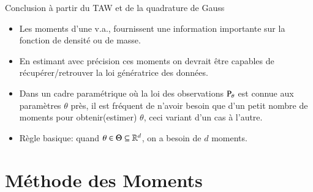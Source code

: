 \begin{frame}
    [allowframebreaks]{Conclusion à partir du TAW et de la quadrature de Gauss}
    \begin{itemize}
        \item Les moments d'une v.a., fournissent une information importante sur la fonction de densité ou de masse.
        \item En estimant avec précision ces moments on devrait être capables de récupérer/retrouver la loi génératrice des données.
        \item Dans un cadre paramétrique où la loi des observations $\operatorname{P}_\theta$ est connue aux paramètres $\theta$ près, il est fréquent de n'avoir 
        besoin que d'un petit nombre de moments pour obtenir(estimer) $\theta$, ceci variant d'un cas à l'autre.
        \item Règle basique: quand $\theta\in \Theta\subseteq\mathbb{R}^d$, on a besoin de $d$ moments.
    \end{itemize}
\end{frame}

\section{Méthode des Moments}
\frame{\sectionpage}

